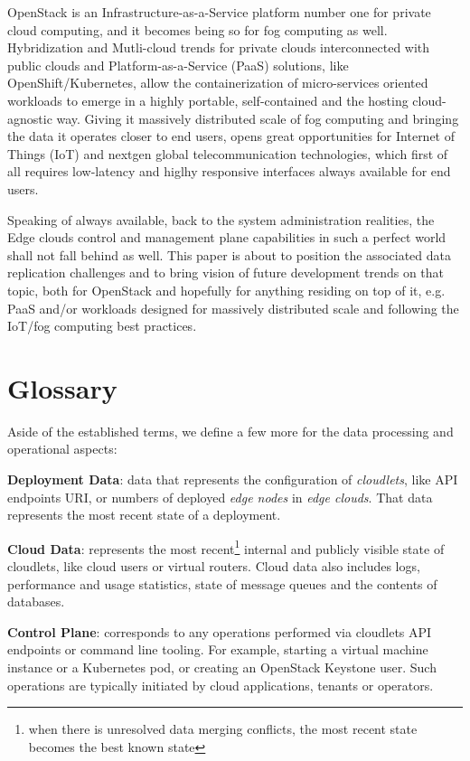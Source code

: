 \documentclass[conference]{IEEEtran}
\begin{document}
OpenStack is an Infrastructure-as-a-Service platform number one for private
cloud computing, and it becomes being so for fog computing as well.
Hybridization and Mutli-cloud trends for private clouds interconnected with
public clouds and Platform-as-a-Service (PaaS) solutions, like
OpenShift/Kubernetes, allow the containerization of micro-services oriented
workloads to emerge in a highly portable, self-contained and the hosting
cloud-agnostic way. Giving it massively distributed scale of fog computing and
bringing the data it operates closer to end users, opens great opportunities
for Internet of Things (IoT) and nextgen global telecommunication technologies,
which first of all requires low-latency and higlhy responsive interfaces always
available for end users.

Speaking of always available, back to the system administration realities, the
Edge clouds control and management plane capabilities in such a perfect world
shall not fall behind as well. This paper is about to position the associated
data replication challenges and to bring vision of future development trends on
that topic, both for OpenStack and hopefully for anything residing on top of
it, e.g. PaaS and/or workloads designed for massively distributed scale and
following the IoT/fog computing best practices.

\section{Glossary}

Aside of the established terms\cite{b3}, we define a few more for the data
processing and operational aspects:

\textbf{Deployment Data}: data that represents the configuration of
\textit{cloudlets}\cite{b3}, like API endpoints URI, or numbers of deployed
\textit{edge nodes}\cite{b3} in \textit{edge clouds}\cite{b3}. That data
represents the most recent state of a deployment.

\textbf{Cloud Data}: represents the most recent\footnote{when there is
unresolved data merging conflicts, the most recent state becomes the best known
state} internal and publicly visible state of cloudlets, like cloud users or
virtual routers. Cloud data also includes logs, performance and usage
statistics, state of message queues and the contents of databases.

\textbf{Control Plane}: corresponds to any operations performed via cloudlets
API endpoints or command line tooling. For example, starting a virtual machine
instance or a Kubernetes pod, or creating an OpenStack Keystone user. Such
operations are typically initiated by cloud applications, tenants or operators.
\end{document}
